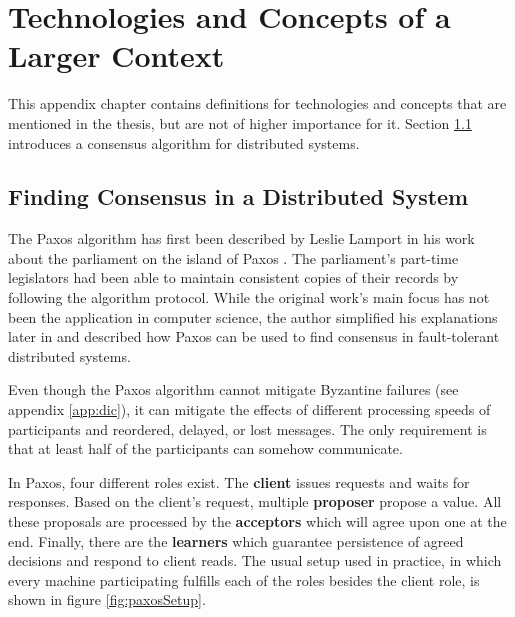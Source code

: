 
\cleardoublepage
\chapter{Technologies and Concepts of a Larger Context}

This appendix chapter contains definitions for technologies and concepts that are mentioned in the thesis, but are not of higher importance for it. Section \ref{sec:paxos} introduces a consensus algorithm for distributed systems.

\section{Finding Consensus in a Distributed System}
\label{sec:paxos}

The Paxos algorithm has first been described by Leslie Lamport in his work about the parliament on the island of Paxos \cite{paxos1998}. The parliament's part-time legislators had been able to maintain consistent copies of their records by following the algorithm protocol.  While the original work's main focus has not been the application in computer science, the author simplified his explanations later in \cite{paxos2001} and described how Paxos can be used to find consensus in fault-tolerant distributed systems.

Even though the Paxos algorithm cannot mitigate Byzantine failures (see appendix \ref{app:dic}), it can mitigate the effects of different processing speeds of participants and reordered, delayed, or lost messages. The only requirement is that at least half of the participants can somehow communicate.

In Paxos, four different roles exist. The \textbf{client} issues requests and waits for responses. Based on the client's request, multiple \textbf{proposer} propose a value. All these proposals are processed by the \textbf{acceptors} which will agree upon one at the end. Finally, there are the \textbf{learners} which guarantee persistence of agreed decisions and respond to client reads. The usual setup used in practice, in which every machine participating fulfills each of the roles besides the client role, is shown in figure \ref{fig:paxosSetup}.

